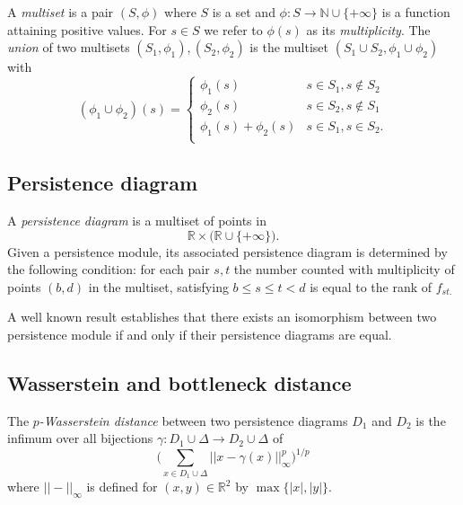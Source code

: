 \documentclass{amsart}
\begin{document}
	A \textit{multiset} is a pair $(S, \phi)$ where $S$ is a set and $\phi : S \to \mathbb N \cup \{+\infty\}$ is a function attaining positive values. For $s \in S$ we refer to $\phi(s)$ as its \textit{multiplicity}. The \textit{union} of two multisets $(S_1, \phi_1), (S_2, \phi_2)$ is the multiset $(S_1 \cup S_2, \phi_1 \cup \phi_2)$ with
	\begin{equation*}
	(\phi_1 \cup \phi_2)(s) = 
	\begin{cases}
	\phi_1(s) & s \in S_1, s \not\in S_2 \\
	\phi_2(s) & s \in S_2, s \not\in S_1 \\
	\phi_1(s) + \phi_2(s) & s \in S_1, s \in S_2. \\
	\end{cases}
	\end{equation*}
	
	\subsection*{Persistence diagram} \label{persistence_diagram}
	
	A \textit{persistence diagram} is a
	multiset of points in
	\begin{equation*}
	\mathbb R \times \big( \mathbb{R} \cup \{+\infty\} \big).
	\end{equation*}	
	Given a 
	persistence module, its associated persistence diagram is determined by the following condition: for each pair $s,t$ the number counted with multiplicity of points $(b,d)$ in the multiset, satisfying $b \leq s \leq t < d$ is equal to the rank of $f_{st.}$
	
	A well known result establishes that there exists an isomorphism between two persistence module if and only if their persistence diagrams are equal.
	
	\subsection*{Wasserstein and bottleneck distance}	\label{wasserstein_and_bottleneck_distance}
	
	The $p$\textit{-Wasserstein distance} between two persistence diagrams $D_1$ and $D_2$ is the infimum over all bijections $\gamma: D_1 \cup \Delta \to D_2 \cup \Delta$ of
	\begin{equation*}
	\Big(\sum_{x \in D_1 \cup \Delta} ||x - \gamma(x)||_\infty^p \Big)^{1/p}
	\end{equation*}
	where $||-||_\infty$ is defined for $(x,y) \in \mathbb R^2$ by $\max\{|x|, |y|\}$. 
	
\end{document}
